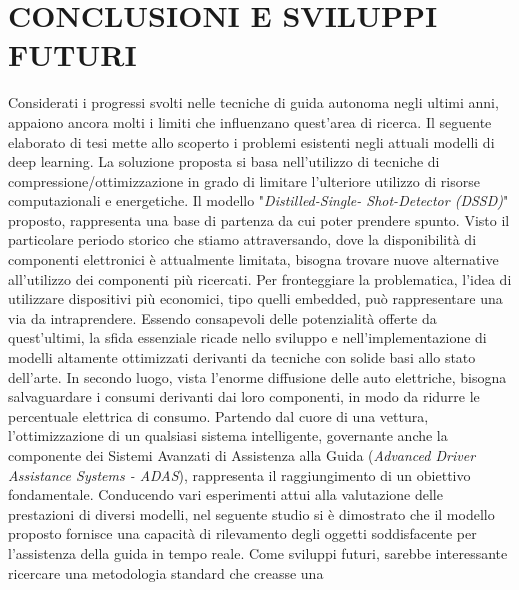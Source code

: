 
\chapter{CONCLUSIONI E SVILUPPI FUTURI}
\label{Capitolo5}
\thispagestyle{empty}
Considerati i progressi svolti nelle tecniche di guida autonoma negli ultimi 
anni, appaiono ancora molti i limiti che influenzano quest'area di ricerca. 
Il seguente elaborato di tesi mette allo scoperto i problemi esistenti negli 
attuali modelli di deep learning. La soluzione proposta si basa nell'utilizzo 
di tecniche di compressione/ottimizzazione in grado di limitare l'ulteriore 
utilizzo di risorse computazionali e energetiche. Il modello "\emph{Distilled-Single-
Shot-Detector (DSSD)}" proposto, rappresenta una base di partenza da 
cui poter prendere spunto. Visto il particolare periodo storico che stiamo 
attraversando, dove la disponibilità di componenti elettronici è attualmente 
limitata, bisogna trovare nuove alternative all'utilizzo dei componenti più 
ricercati. Per fronteggiare la problematica, l'idea di utilizzare dispositivi 
più economici, tipo quelli embedded, può rappresentare una via da intraprendere.
Essendo consapevoli delle potenzialità offerte da quest'ultimi, 
la sfida essenziale ricade nello sviluppo e nell'implementazione di modelli 
altamente ottimizzati derivanti da tecniche con solide basi allo stato dell'arte. 
In secondo luogo, vista l'enorme diffusione delle auto elettriche, bisogna 
salvaguardare i consumi derivanti dai loro componenti, in modo da ridurre 
le percentuale elettrica di consumo. Partendo dal cuore di una vettura, 
l'ottimizzazione di un qualsiasi sistema intelligente, governante anche la 
componente dei Sistemi Avanzati di Assistenza alla Guida (\emph{Advanced Driver 
Assistance Systems - ADAS}),  rappresenta il raggiungimento di un obiettivo 
fondamentale. Conducendo vari esperimenti attui alla valutazione delle 
prestazioni di diversi modelli, nel seguente studio si è dimostrato che il 
modello proposto fornisce una capacità di rilevamento degli oggetti soddisfacente 
per l'assistenza della guida in tempo reale. Come sviluppi futuri, 
sarebbe interessante ricercare una metodologia standard che creasse una 
